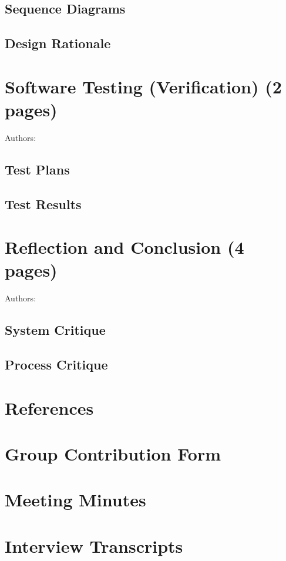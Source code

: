 \documentclass[12pt,a4paper]{article}
\begin{document}
\subsection{Sequence Diagrams}

\subsection{Design Rationale}


\section{Software Testing (Verification) (2 pages)}
Authors:
\label{sec:testing}
\subsection{Test Plans}

\subsection{Test Results}


\section{Reflection and Conclusion (4 pages)}
Authors:
\label{sec:reflection}
\subsection{System Critique}

\subsection{Process Critique}


\newpage

\section*{References}
% 

\newpage
\appendix

\section{Group Contribution Form}

\section{Meeting Minutes}

\section{Interview Transcripts}
\end{document}
